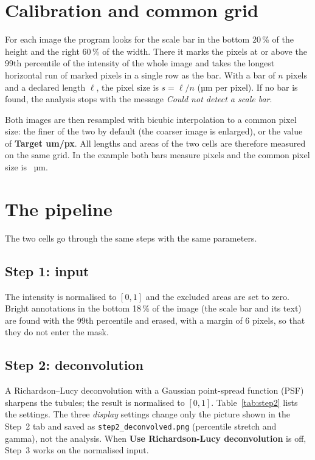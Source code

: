 \documentclass[fontsize=10.5pt,paper=a4,parskip=half,headings=normal,numbers=noenddot,
  open=any,captions=tableheading]{scrreprt}
\newcommand{\btn}[1]{\textsf{\textbf{#1}}}
\newcommand{\file}[1]{\texttt{#1}}
\begin{document}
\section{Calibration and common grid}\label{sec:calibration}

For each image the program looks for the scale bar in the bottom 20\,\% of the height and the right 60\,\% of the width. There it marks the pixels at or above the 99th percentile of the intensity of the whole image and takes the longest horizontal run of marked pixels in a single row as the bar. With a bar of $n$ pixels and a declared length $\ell$, the pixel size is $s = \ell/n$ (µm per pixel). If no bar is found, the analysis stops with the message \emph{Could not detect a scale bar}.

Both images are then resampled with bicubic interpolation to a common pixel size: the finer of the two by default (the coarser image is enlarged), or the value of \btn{Target um/px}. All lengths and areas of the two cells are therefore measured on the same grid. In the example both bars measure \ExBarPx{} pixels and the common pixel size is \ExUmPerPx{}~µm.

\section{The pipeline}\label{sec:pipeline}

The two cells go through the same steps with the same parameters.

\subsection*{Step 1: input}
The intensity is normalised to $[0,1]$ and the excluded areas are set to zero. Bright annotations in the bottom 18\,\% of the image (the scale bar and its text) are found with the 99th percentile and erased, with a margin of 6 pixels, so that they do not enter the mask.

\subsection*{Step 2: deconvolution}
A Richardson--Lucy deconvolution with a Gaussian point-spread function (PSF) sharpens the tubules; the result is normalised to $[0,1]$. Table~\ref{tab:step2} lists the settings. The three \emph{display} settings change only the picture shown in the Step~2 tab and saved as \file{step2\_deconvolved.png} (percentile stretch and gamma), not the analysis. When \btn{Use Richardson-Lucy deconvolution} is off, Step~3 works on the normalised input.
\end{document}
